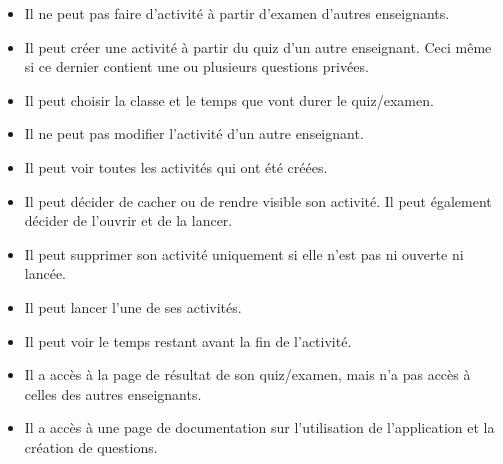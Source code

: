 \begin{itemize}
    \item Il ne peut pas faire d'activité à partir d'examen d'autres enseignants.
    \item Il peut créer une activité à partir du quiz d'un autre enseignant. Ceci même si ce dernier contient une ou plusieurs questions privées.
    \item Il peut choisir la classe et le temps que vont durer le quiz/examen.
    \item Il ne peut pas modifier l'activité d'un autre enseignant.
    \item Il peut voir toutes les activités qui ont été créées.
    \item Il peut décider de cacher ou de rendre visible son activité. Il peut également décider de l'ouvrir et de la lancer.
    \item Il peut supprimer son activité uniquement si elle n'est pas ni ouverte ni lancée.
    \item Il peut lancer l'une de ses activités.
    \item Il peut voir le temps restant avant la fin de l'activité.
    \item Il a accès à la page de résultat de son quiz/examen, mais n'a pas accès à celles des autres enseignants.
    \item Il a accès à une page de documentation sur l'utilisation de l'application et la création de questions.
\end{itemize}

